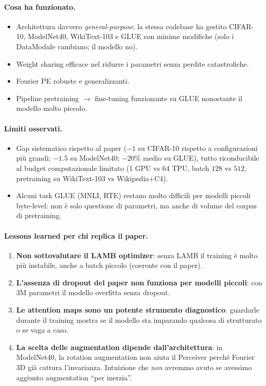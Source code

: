 \documentclass[
  11pt,
]{article}
\begin{document}
\paragraph{Cosa ha funzionato.}
\begin{itemize}
\item Architettura davvero \emph{general-purpose}: la stessa codebase ha gestito CIFAR-10, ModelNet40, WikiText-103 e GLUE con minime modifiche (solo i DataModule cambiano; il modello no).
\item Weight sharing efficace nel ridurre i parametri senza perdite catastrofiche.
\item Fourier PE robuste e generalizzanti.
\item Pipeline pretraining $\to$ fine-tuning funzionante su GLUE nonostante il modello molto piccolo.
\end{itemize}

\paragraph{Limiti osservati.}
\begin{itemize}
\item Gap sistematico rispetto al paper ($-1$ su CIFAR-10 rispetto a configurazioni più grandi; $-1.5$ su ModelNet40; $-20\%$ medio su GLUE), tutto riconducibile al budget computazionale limitato (1 GPU vs 64 TPU, batch $128$ vs $512$, pretraining su WikiText-103 vs Wikipedia+C4).
\item Alcuni task GLUE (MNLI, RTE) restano molto difficili per modelli piccoli byte-level: non è solo questione di parametri, ma anche di volume del corpus di pretraining.
\end{itemize}

\paragraph{Lessons learned per chi replica il paper.}
\begin{enumerate}
\item \textbf{Non sottovalutare il LAMB optimizer}: senza LAMB il training è molto più instabile, anche a batch piccolo (coerente con il paper).
\item \textbf{L'assenza di dropout del paper non funziona per modelli piccoli}: con $3$M parametri il modello overfitta senza dropout.
\item \textbf{Le attention maps sono un potente strumento diagnostico}: guardarle durante il training mostra se il modello sta imparando qualcosa di strutturato o se vaga a caso.
\item \textbf{La scelta delle augmentation dipende dall'architettura}: in ModelNet40, la rotation augmentation non aiuta il Perceiver perché Fourier 3D già cattura l'invarianza. Intuizione che \emph{non} avremmo avuto se avessimo aggiunto augmentation ``per inerzia''.
\end{enumerate}
\end{document}
